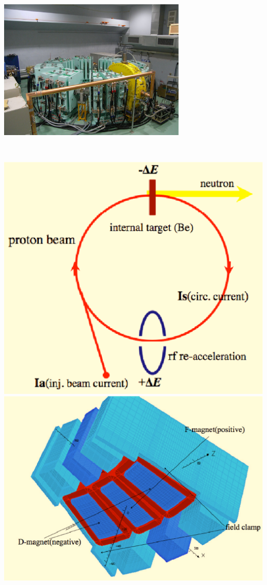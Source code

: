 \documentclass[12pt]{article}
\begin{document}
{\begin{minipage}{.49\linewidth}
\begin{center}
\includegraphics*[width=9.00cm]{./figs_FFAG_introSlides/KurriBNCT.eps}

~

\includegraphics*[width=.49\linewidth]{./figs_FFAG_introSlides/ERIT_sketch.eps}
\includegraphics*[width=.49\linewidth]{./figs_FFAG_introSlides/ERIT_Magnet.eps}

\end{center}
\end{minipage}

} %







\clearpage 

~
\end{document}
